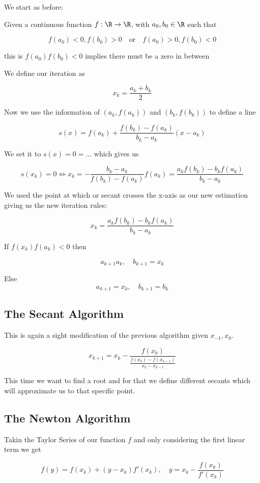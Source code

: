 We start as before: 

Given a continuous function \(f: \R \to \R\), with \(a_0, b_0 \in \R\) such that 

\[
    f(a_0) < 0, f(b_0) > 0 \quad \text{or} \quad f(a_0) > 0, f(b_0) < 0
\]

this is \(f(a_0) f(b_0) < 0\) implies there must be a zero in between 

We define our iteration as

\[
    x_k = \frac{a_k + b_k}{2}
\]

Now we use the information of \((a_k, f(a_k))\) and \((b_k, f(b_k))\) to define a line

\[
    s(x) = f(a_k) + \frac{f(b_k) - f(a_k)}{b_k - a_k} (x - a_k)
\]

We set it to \(s(x) = 0 = ...\) which gives us

\[
    s(x_k) = 0 \iff x_k = - \frac{b_k - a_k}{f(b_k) - f(a_k)}f(a_k) = \frac{a_kf(b_k) - b_kf(a_k)}{b_k - a_k}
\]

We used the point at which or secant crosses the x-axis as our new estimation giving us the new iteration rules:

\[
    x_k = \frac{a_kf(b_k) - b_kf(a_k)}{b_k - a_k}
\]

If \(f(x_k)f(a_k) < 0\) then 

\[
    a_{k + 1} a_k, \quad b_{k + 1} = x_k
\]

Else
\[
    a_{k + 1} = x_k, \quad b_{k + 1} = b_k
\]


\subsection{The Secant Algorithm}

This is again a sight modification of the previous algorithm given \(x_{ - 1}, x_{0}\). 

\[
    x_{k + 1} = x_k - \frac{f(x_k)}{\frac{f(x_k) - f(x_{k - 1})}{x_k - x_{k - 1}}}
\]

This time we want to find a root and for that we define different secants which will approximate us 
to that specific point.

\subsection{The Newton Algorithm}

Takin the Taylor Series of our function \(f\) and only considering the first linear term we get 

\[
    f(y) = f(x_k) + (y - x_k)f'(x_k), \quad y =  x_k - \frac{f(x_k)}{f'(x_k)}
\]

